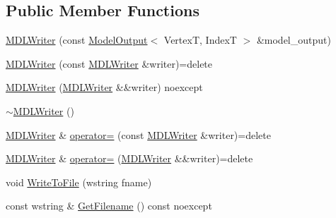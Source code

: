 \subsection*{Public Member Functions}
\begin{DoxyCompactItemize}
\item 
\mbox{\hyperlink{classmage_1_1rendering_1_1loader_1_1_m_d_l_writer_a6b30e49f08b5c6cd4702f5fdecd17561}{M\+D\+L\+Writer}} (const \mbox{\hyperlink{structmage_1_1rendering_1_1_model_output}{Model\+Output}}$<$ VertexT, IndexT $>$ \&model\+\_\+output)
\item 
\mbox{\hyperlink{classmage_1_1rendering_1_1loader_1_1_m_d_l_writer_a475ff3efdba707303052bae28d3ba85b}{M\+D\+L\+Writer}} (const \mbox{\hyperlink{classmage_1_1rendering_1_1loader_1_1_m_d_l_writer}{M\+D\+L\+Writer}} \&writer)=delete
\item 
\mbox{\hyperlink{classmage_1_1rendering_1_1loader_1_1_m_d_l_writer_a27f71b3a27f96e263948d19b8b570309}{M\+D\+L\+Writer}} (\mbox{\hyperlink{classmage_1_1rendering_1_1loader_1_1_m_d_l_writer}{M\+D\+L\+Writer}} \&\&writer) noexcept
\item 
\mbox{\hyperlink{classmage_1_1rendering_1_1loader_1_1_m_d_l_writer_aaa0fb8c60dee5352ed467bfb3f283f43}{$\sim$\+M\+D\+L\+Writer}} ()
\item 
\mbox{\hyperlink{classmage_1_1rendering_1_1loader_1_1_m_d_l_writer}{M\+D\+L\+Writer}} \& \mbox{\hyperlink{classmage_1_1rendering_1_1loader_1_1_m_d_l_writer_a9e5f38a8b5016534385039d44d3d71dc}{operator=}} (const \mbox{\hyperlink{classmage_1_1rendering_1_1loader_1_1_m_d_l_writer}{M\+D\+L\+Writer}} \&writer)=delete
\item 
\mbox{\hyperlink{classmage_1_1rendering_1_1loader_1_1_m_d_l_writer}{M\+D\+L\+Writer}} \& \mbox{\hyperlink{classmage_1_1rendering_1_1loader_1_1_m_d_l_writer_aaa2a3f4e8025bffefefaae7d3ef018f0}{operator=}} (\mbox{\hyperlink{classmage_1_1rendering_1_1loader_1_1_m_d_l_writer}{M\+D\+L\+Writer}} \&\&writer)=delete
\item 
void \mbox{\hyperlink{classmage_1_1rendering_1_1loader_1_1_m_d_l_writer_a9af5416468b0a51983d07aec8061eb27}{Write\+To\+File}} (wstring fname)
\item 
const wstring \& \mbox{\hyperlink{classmage_1_1rendering_1_1loader_1_1_m_d_l_writer_aedbc8d5fa02444ecba2e040ca8e98281}{Get\+Filename}} () const noexcept
\end{DoxyCompactItemize}
